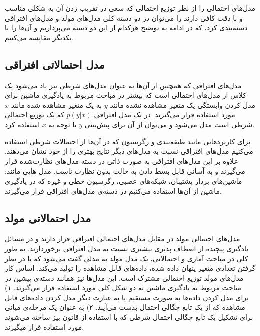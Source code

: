 مدل‌های احتمالی‌ را از نظر توزیع احتمالی‌ که سعی‌ در تقریب زدن آن به شکلی‌ مناسب و با دقت کافی‌ دارند را می‌‌توان در دو دسته کلی‌ مدل‌های مولد
و مدل‌های افتراقی
 دسته‌بندی کرد، که در ادامه به توضیح هرکدام از این دو دسته می‌‌پردازیم و آن‌ها را با یکدیگر مقایسه می‌‌کنیم.

	\subsection{مدل‌ احتمالاتی افتراقی}
	مدل‌های افتراقی که همچنین از آن‌ها به عنوان مدل‌های شرطی
	نیز یاد می‌‌شود یک کلاس از مدل‌های احتمالی‌ است که بیشتر در مباحث مربوط به یادگیری ماشین
	برای مدل کردن وابستگی یک متغیر مشاهده نشده مانند
	$y$
	به یک متغیر مشاهده شده مانند
	$x$
	مورد استفاده قرار می‌‌گیرند. در یک مدل افتراقی
	$p(y|x)$
	که یک توزیع احتمالی‌ شرطی است مدل می‌‌شود و می‌‌توان از آن برای پیش‌بینی‌
	$y$
	با توجه به
	$x$
	استفاده کرد.
	
	برای کاربردهایی مانند طبقه‌بندی
	و رگرسیون
	که در آن‌ها از احتمالات شرطی استفاده می‌‌کنیم مدل‌های افتراقی نسبت به مدل‌های دیگر نتایج بهتری را از خود نشان می‌‌دهند. علاوه بر این مدل‌های افتراقی به صورت ذاتی در دسته مدل‌های نظارت‌شده
	قرار می‌‌گیرند و به آسانی‌ قابل بسط دادن به حالت بدون نظارت
	ناست. مدل هایی مانند: ماشین‌های بردار پشتیبان،
	 شبکه‌های عصبی، 
	 رگرسیون خطی‌
	  و غیره که در یادگیری ماشین از آن‌ها استفاده می‌‌کنیم در دسته‌ی مدل‌های افتراقی قرار می‌‌گیرند.
	
	\subsection{مدل‌ احتمالاتی مولد}
	\label{chap2sec3sub2}
	مدل‌های احتمالی‌ مولد در مقابل مدل‌های احتمالی‌ افتراقی قرار دارند و در مسائل یادگیری پیچیده از انعطاف پذیری بیشتری نسبت به مدل افتراقی برخوردارند. به طور کلی‌ در مباحث آماری و احتمالاتی، یک مدل مولد به مدلی‌ گفت می‌‌شود که با در نظر گرفتن تعدادی متغیر پنهان داده شده، داده‌های قابل مشاهده را تولید می‌‌کند. اساس کار مدل‌های مولد توزیع احتمالی‌ مشترک
	است. این مدل‌ها نیز همانند دسته‌ی پیشین در مباحث مربوط به یادگیری ماشین به دو شکل کلی‌ مورد استفاده قرار می‌‌گیرند. ۱) برای مدل کردن داده‌ها به صورت مستقیم یا به عبارت دیگر مدل کردن داده‌های قابل مشاهده که از یک تابع چگالی احتمال
	بدست می‌‌آیند. ۲) به عنوان یک مرحله‌ی میانی برای تشکیل یک تابع چگالی احتمال شرطی
	که با استفاده از قانون بیز
	 ساخته می‌‌شوند مورد استفاده قرار میگیرند.
	
